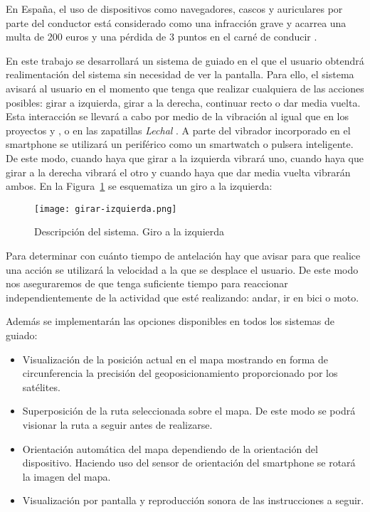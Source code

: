 \documentclass{pre-tfg}
\begin{document}
En España, el uso de dispositivos como navegadores, cascos y auriculares por parte del conductor
está considerado como una infracción grave y acarrea una multa de 200 euros y una pérdida de 3
puntos en el carné de conducir \cite{Serrano14} .

En este trabajo se desarrollará un sistema de guiado en el que el usuario obtendrá realimentación
del sistema sin necesidad de ver la pantalla. Para ello, el sistema avisará al usuario en el momento
que tenga que realizar cualquiera de las acciones posibles: girar a izquierda, girar a la derecha,
continuar recto o dar media vuelta. Esta interacción se llevará a cabo por medio de la vibración al
igual que en los proyectos \cite{Boemo12} y \cite{Merino13}, o en las zapatillas \textit{Lechal}
\cite{Lechal} . A parte del vibrador incorporado en el smartphone se utilizará un periférico como un
smartwatch o pulsera inteligente. De este modo, cuando haya que girar a la izquierda vibrará uno,
cuando haya que girar a la derecha vibrará el otro y cuando haya que dar media vuelta vibrarán
ambos. En la Figura~\ref{fig:descipcion_sistema} se esquematiza un giro a la izquierda:

\begin{figure}[!h]
  \begin{center}
    \texttt{[image: girar-izquierda.png]}
    \caption{Descripción del sistema. Giro a la izquierda}
    \label{fig:descipcion_sistema}
  \end{center}
  \vspace{-25pt}
\end{figure}

Para determinar con cuánto tiempo de antelación hay que avisar para que realice una acción se
utilizará la velocidad a la que se desplace el usuario. De este modo nos aseguraremos de que tenga
suficiente tiempo para reaccionar independientemente de la actividad que esté realizando: andar, ir
en bici o moto.

Además se implementarán las opciones disponibles en todos los sistemas de guiado:

\begin{itemize}
  \item Visualización de la posición actual en el mapa mostrando en forma de circunferencia la
    precisión del geoposicionamiento proporcionado por los satélites.
  \item Superposición de la ruta seleccionada sobre el mapa. De este modo se podrá visionar la ruta
    a seguir antes de realizarse.
  \item Orientación automática del mapa dependiendo de la orientación del dispositivo. Haciendo uso
    del sensor de orientación del smartphone se rotará la imagen del mapa.
  \item Visualización por pantalla y reproducción sonora de las instrucciones a seguir. 
\end{itemize}
\end{document}
